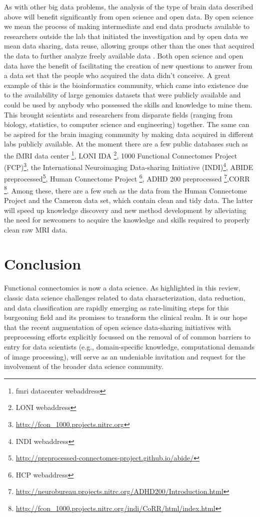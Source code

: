 As with other big data problems, the analysis of the type of brain data
described above will benefit significantly from open science and open data. By
open science we mean the process of making intermediate and end data products
available to researchers outside the lab that initiated the investigation and
by open data we mean data sharing, data reuse, allowing groups other than the
ones that acquired the data to further analyze freely available data
\cite{Milham2012}. Both open science and open data have the benefit of
facilitating the creation of new questions to answer from a data set that the
people who acquired the data didn't conceive. A great example of this is the
bioinformatics community, which came into existence due to the availability of
large genomics datasets that were publicly available and could be used by
anybody who possessed the skills and knowledge to mine them\cite{VanHorn2013}.
This brought scientists and researchers from disparate fields (ranging from
biology, statistics, to computer science and engineering) together. The same
can be aspired for the brain imaging community by making data acquired in
different labs publicly available. At the moment there are a few public
databases such as the fMRI data center \footnote{fmri datacenter webaddress},
LONI IDA \footnote{LONI webaddress}, 1000 Functional Connectomes Project
(FCP)\footnote{\url{http://fcon_1000.projects.nitrc.org}}, the International
Neuroimaging Data-sharing Initiative (INDI)\footnote{INDI webaddress}, ABIDE
preprocessed\footnote{\url{http://preprocessed-connectomes-project.github.io/abide/}},
Human Connectome Project \footnote{HCP webaddress}, ADHD 200 preprocessed
\footnote{\url{http://neurobureau.projects.nitrc.org/ADHD200/Introduction.html}},CORR
\footnote{\url{http://fcon_1000.projects.nitrc.org/indi/CoRR/html/index.html}}.
Among these, there are a few such as the data from the Human Connectome Project
and the Cameron data set, which contain clean and tidy data. The latter will
speed up knowledge discovery and new method development by alleviating the need
for newcomers to acquire the knowledge and skills required to properly clean
raw MRI data. 

\section {Conclusion}
Functional connectomics is now a data science. As highlighted in this review, classic data science challenges related to data characterization, data reduction, and data classification 
are rapidly emerging as rate-limiting steps for this burgeoning field and its promises to transform the clinical realm. It is our hope that the recent augmentation of open science data-sharing initiatives with preprocessing efforts explicitly focussed on the removal of of common barriers to entry for data scientists (e.g., domain-specific knowledge, computational demands of image processing), will serve as an undeniable invitation and request for the involvement of the broader data science community.
 


